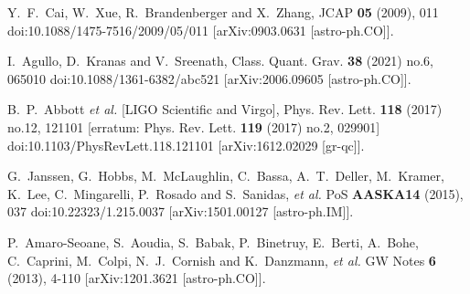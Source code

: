 \documentclass{article}
\begin{document}
\begin{thebibliography}{99}
  
Y.~F.~Cai, W.~Xue, R.~Brandenberger and X.~Zhang,
JCAP \textbf{05} (2009), 011
doi:10.1088/1475-7516/2009/05/011
[arXiv:0903.0631 [astro-ph.CO]].
  
  
  
I.~Agullo, D.~Kranas and V.~Sreenath,
Class. Quant. Grav. \textbf{38} (2021) no.6, 065010
doi:10.1088/1361-6382/abc521
[arXiv:2006.09605 [astro-ph.CO]].

B.~P.~Abbott \textit{et al.} [LIGO Scientific and Virgo],
Phys. Rev. Lett. \textbf{118} (2017) no.12, 121101
[erratum: Phys. Rev. Lett. \textbf{119} (2017) no.2, 029901]
doi:10.1103/PhysRevLett.118.121101
[arXiv:1612.02029 [gr-qc]].

G.~Janssen, G.~Hobbs, M.~McLaughlin, C.~Bassa, A.~T.~Deller, M.~Kramer, K.~Lee, C.~Mingarelli, P.~Rosado and S.~Sanidas, \textit{et al.}
PoS \textbf{AASKA14} (2015), 037
doi:10.22323/1.215.0037
[arXiv:1501.00127 [astro-ph.IM]].

P.~Amaro-Seoane, S.~Aoudia, S.~Babak, P.~Binetruy, E.~Berti, A.~Bohe, C.~Caprini, M.~Colpi, N.~J.~Cornish and K.~Danzmann, \textit{et al.}
GW Notes \textbf{6} (2013), 4-110
[arXiv:1201.3621 [astro-ph.CO]].










\end{thebibliography}
\end{document}
